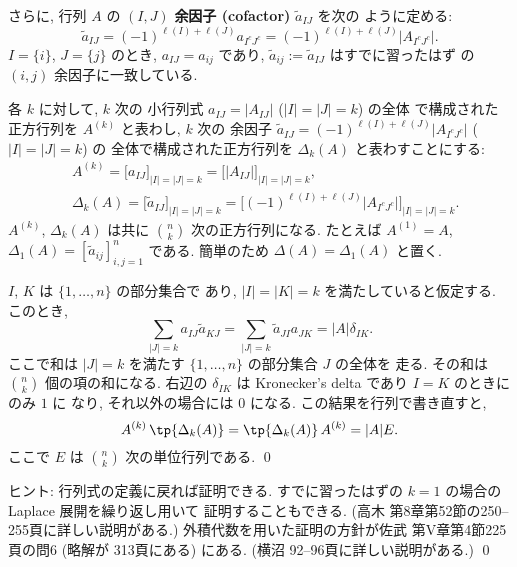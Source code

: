 \documentclass[12pt,twoside]{jarticle}
\begin{document}
さらに, 行列 $A$ の $(I,J)$ {\bf 余因子 (cofactor)} $\tilde{a}_{IJ}$ を次の
ように定める: 
\begin{equation*}
  \tilde{a}_{IJ}
  = (-1)^{\ell(I)+\ell(J)} a_{I^cJ^c}
  = (-1)^{\ell(I)+\ell(J)} |A_{I^cJ^c}|.
\end{equation*}
$I=\{i\}$, $J=\{j\}$ のとき, $a_{IJ}=a_{ij}$ 
であり, $\tilde{a}_{ij}:=\tilde{a}_{IJ}$ はすでに習ったはず
の $(i,j)$ 余因子に一致している. 

各 $k$ に対して, $k$ 次の
小行列式 $a_{IJ}=|A_{IJ}|$ ($|I|=|J|=k$) の全体
で構成された正方行列を $A^{(k)}$ と表わし, $k$ 次の
余因子 $\tilde{a}_{IJ}=(-1)^{\ell(I)+\ell(J)} |A_{I^cJ^c}|$ ($|I|=|J|=k$) の
全体で構成された正方行列を $\Delta_k(A)$ と表わすことにする:
\begin{align*}
  &
  A^{(k)}
  = \bigl[ a_{IJ} \bigr]_{|I|=|J|=k}
  = \bigl[ |A_{IJ}| \bigr]_{|I|=|J|=k}, 
  \\ &
  \Delta_k(A) 
  = \bigl[ \tilde{a}_{IJ} \bigr]_{|I|=|J|=k}
  = \bigl[ (-1)^{\ell(I)+\ell(J)} |A_{I^cJ^c}| \bigr]_{|I|=|J|=k}.
\end{align*}
$A^{(k)}$, $\Delta_k(A)$ は共に $\binom{n}{k}$ 次の正方行列になる.
たとえば $A^{(1)}=A$, $\Delta_1(A)=[\tilde{a}_{ij}]_{i,j=1}^n$ である.
簡単のため $\Delta(A)=\Delta_1(A)$ と置く.


\begin{question}[Laplace 展開]
\label{q:Laplace-expansion}
  $I$, $K$ は $\{1,\dots,n\}$ の部分集合で
  あり, $|I|=|K|=k$ を満たしていると仮定する. このとき,
  \begin{equation*}
      \sum_{|J|=k} a_{IJ} \tilde{a}_{KJ}
    = \sum_{|J|=k} \tilde{a}_{JI} a_{JK}
    = |A| \delta_{IK}.
  \end{equation*}
  ここで和は $|J|=k$ を満たす $\{1,\dots,n\}$ の部分集合 $J$ の全体を
  走る. その和は $\binom{n}{k}$ 個の項の和になる.  
  右辺の $\delta_{IK}$ は Kronecker's delta であり $I=K$ のときにのみ $1$ に
  なり, それ以外の場合には $0$ になる.  この結果を行列で書き直すと,
  \begin{equation*}
      A^{(k)}\,\tp{\Delta_k(A)}
    = \tp{\Delta_k(A)}\,A^{(k)}
    = |A| E.
  \end{equation*}
  ここで $E$ は $\binom{n}{k}$ 次の単位行列である.  \qed    
\end{question}

\medskip
\noindent
ヒント: 行列式の定義に戻れば証明できる. 
すでに習ったはずの $k=1$ の場合の Laplace 展開を繰り返し用いて
証明することもできる.
(高木 \cite{takagi1} 第8章第52節の250--255頁に詳しい説明がある.)
外積代数を用いた証明の方針が佐武 \cite{satake} 第V章第4節225頁の問6 (略解が
313頁にある) にある. (横沼 \cite{yokonuma} 92--96頁に詳しい説明がある.)
\qed
\end{document}
